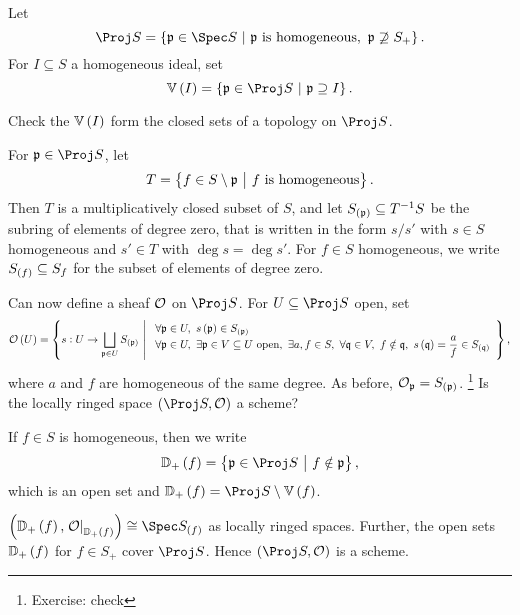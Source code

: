 \begin{definition*}
Let
$$ \Proj S = \cbr{\ppp \in \Spec S \st \ppp \ \text{is homogeneous}, \ \ppp \not\supseteq S_+}. $$
For $ I \subseteq S $ a homogeneous ideal, set
$$ \VV\br{I} = \cbr{\ppp \in \Proj S \st \ppp \supseteq I}. $$
\end{definition*}

\begin{exercise*}
Check the $ \VV\br{I} $ form the closed sets of a topology on $ \Proj S $.
\end{exercise*}

\pagebreak


\begin{notation*}
For $ \ppp \in \Proj S $, let
$$ T = \cbr{f \in S \setminus \ppp \st f \ \text{is homogeneous}}. $$
Then $ T $ is a multiplicatively closed subset of $ S $, and let $ S_{\br{\ppp}} \subseteq T^{-1}S $ be the subring of elements of degree zero, that is written in the form $ s / s' $ with $ s \in S $ homogeneous and $ s' \in T $ with $ \deg s = \deg s' $. For $ f \in S $ homogeneous, we write $ S_{\br{f}} \subseteq S_f $ for the subset of elements of degree zero.
\end{notation*}

Can now define a sheaf $ \mathcal{O} $ on $ \Proj S $. For $ U \subseteq \Proj S $ open, set
$$ \OOO\br{U} = \cbr{s : U \to \bigsqcup_{\ppp \in U} S_{\br{\ppp}} \st \begin{array}{l} \forall \ppp \in U, \ s\br{\ppp} \in S_{\br{\ppp}} \\ \forall \ppp \in U, \ \exists \ppp \in V \subseteq U \ \text{open}, \ \exists a, f \in S, \ \forall \qqq \in V, \ f \notin \qqq, \ s\br{\qqq} = \dfrac{a}{f} \in S_{\br{\qqq}} \end{array}}, $$
where $ a $ and $ f $ are homogeneous of the same degree. As before, $ \OOO_\ppp = S_{\br{\ppp}} $. \footnote{Exercise: check} Is the locally ringed space $ \br{\Proj S, \OOO} $ a scheme?

\begin{notation*}
If $ f \in S $ is homogeneous, then we write
$$ \DD_+\br{f} = \cbr{\ppp \in \Proj S \st f \notin \ppp}, $$
which is an open set and $ \DD_+\br{f} = \Proj S \setminus \VV\br{f} $.
\end{notation*}

\begin{proposition}
$ \br{\DD_+\br{f}, \eval{\OOO}_{\DD_+\br{f}}} \cong \Spec S_{\br{f}} $ as locally ringed spaces. Further, the open sets $ \DD_+\br{f} $ for $ f \in S_+ $ cover $ \Proj S $. Hence $ \br{\Proj S, \OOO} $ is a scheme.
\end{proposition}

